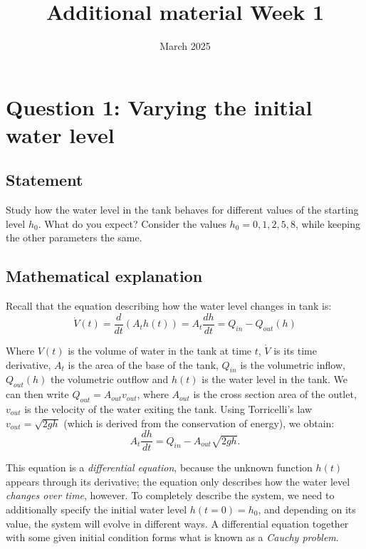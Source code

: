 \documentclass{article}
\title{Additional material Week 1}
\date{March 2025}
\begin{document}
\maketitle

\section{Question 1: Varying the initial water level}
\subsection{Statement}
Study how the water level in the tank behaves for different values of the starting level $h_0$. What do you expect? Consider the values $h_0 = 0, 1, 2, 5, 8$, while keeping the other parameters the same.

\subsection{Mathematical explanation}
Recall that the equation describing how the water level changes in tank is:
\begin{equation}
    \dot V(t)= \frac{d}{dt}(A_t h(t)) = A_t \frac{dh}{dt}=Q_{in}-Q_{out}(h)
\end{equation}

Where $V(t)$ is the volume of water in the tank at time $t$, $\dot V$ is its time derivative, $A_t$ is the area of the base of the tank, $Q_{in}$ is the volumetric inflow, $Q_{out}(h)$ the volumetric outflow and $h(t)$ is the water level in the tank.
We can then write $Q_{out}=A_{out}v_{out}$, where  $A_{out}$ is the cross section area of the outlet, $v_{out}$ is the velocity of the water exiting the tank. Using Torricelli's law $v_{out} = \sqrt{2gh}$ (which is derived from the conservation of energy), we obtain:
\begin{equation}\label{pb}
    A_t \frac{dh}{dt}=Q_{in}-A_{out}\sqrt{2gh}.
\end{equation}

This equation is a \emph{differential equation}, because the unknown function $h(t)$ appears through its derivative; the equation only describes how the water level \emph{changes over time}, however. To completely describe the system, we need to additionally specify the initial water level $h(t=0)=h_0$, and depending on its value, the system will evolve in different ways. A differential equation together with some given initial condition forms what is known as a \emph{Cauchy problem}.
\end{document}
